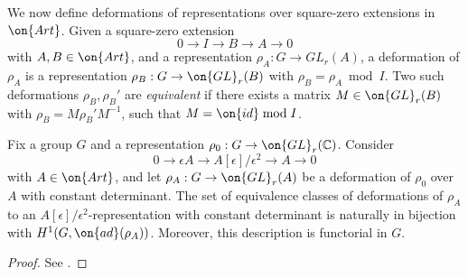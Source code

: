 We now define deformations of representations over square-zero extensions in
$\on{Art}$.
  Given a square-zero extension $$0\to I\to B\to A\to 0$$ with $A, B\in\on{Art}$, and a representation $\rho_A: G\to GL_r(A)$, a deformation of $\rho_A$ is a representation $\rho_B: G\to \on{GL}_r(B)$ with $\rho_B=\rho_A\bmod I$. Two such deformations $\rho_B, \rho_B'$ are \emph{equivalent} if there exists a matrix $M\in \on{GL}_r(B)$ with $\rho_B=M\rho_B'M^{-1}$, such that $M=\on{id}\bmod I$.
  \begin{lemma}
\notready
	\label{lemma:tangent-space}
	Fix a group $G$ and a representation $\rho_0 : G \to \on{GL}_r(\mathbb C)$. Consider $$0\to \epsilon A\to A[\epsilon]/\epsilon^2\to A\to 0$$ with $A\in\on{Art}$, and let $\rho_A: G\to \on{GL}_r(A)$ be a deformation of $\rho_0$ over $A$ with constant determinant.
	The set of equivalence classes of deformations of $\rho_A$ to an $A[\epsilon]/\epsilon^2$-representation with constant determinant is naturally in bijection with $H^1(G, \on{ad}(\rho_A))$.
	Moreover, this description is functorial in $G$.
\end{lemma}
\begin{proof}
See \cite[Chapter V, \S21, Proposition 1]{mazur1997introduction}.
\end{proof}

